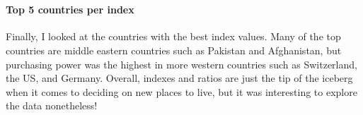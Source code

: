\documentclass[11pt]{article}
\begin{document}
    \begin{center}
    \end{center}
    { \hspace*{\fill} \\}
    
    \begin{center}
    \end{center}
    { \hspace*{\fill} \\}
    
    \begin{center}
    \end{center}
    { \hspace*{\fill} \\}
    
    \begin{center}
    \end{center}
    { \hspace*{\fill} \\}
    
    \begin{center}
    \end{center}
    { \hspace*{\fill} \\}
    
    \begin{center}
    \end{center}
    { \hspace*{\fill} \\}
    
    \hypertarget{top-5-countries-per-index}{%
\paragraph{Top 5 countries per index}\label{top-5-countries-per-index}}

    Finally, I looked at the countries with the best index values. Many of
the top countries are middle eastern countries such as Pakistan and
Afghanistan, but purchasing power was the highest in more western
countries such as Switzerland, the US, and Germany. Overall, indexes and
ratios are just the tip of the iceberg when it comes to deciding on new
places to live, but it was interesting to explore the data nonetheless!
\end{document}
